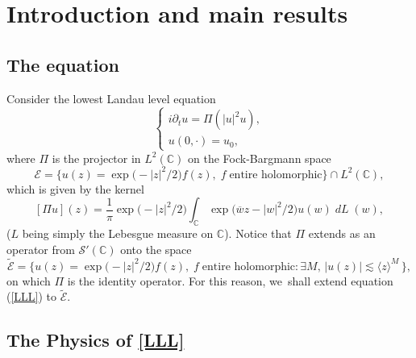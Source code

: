 \documentclass[JEP,XML,SOM,Unicode,NoFloatCountersInSection,published]{cedram}
\let\sep:
\DeclareMathOperator{\dL}{\mathit{dL}}
\theoremstyle{definition}
\let\EE\exp
\let\ov\overline
\let\<\langle
\let\>\rangle
\newcommand\C{\mathbb C}
\begin{document}
\maketitle

\tableofcontents
\mainmatter

\section{Introduction and main results}

\subsection{The equation}

Consider the lowest Landau level equation\vspace*{-3pt}
\begin{equation}\label{LLL}\tag{LLL}
\begin{cases}
i \partial_t u = \Pi (|u|^2 u),\\
u(0,\cdot)= u_0,
\end{cases}
\end{equation}
where $\Pi$ is the projector in $L^2(\C)$ on the Fock-Bargmann space\vspace*{-3pt}
\[
\mathcal{E} =\bigl\{ u(z) = \EE\bigl(-{|z|^2}/2\bigr) f(z),\;f \; \text{entire\ holomorphic}\bigr\}\cap L^2(\C),
\]
which is given by the kernel\vspace*{-3pt}
\begin{equation}\label{defPi}
[\Pi u](z) = \frac{1}{\pi} \EE\bigl(-{|z|^2}/2\bigr) \int_\mathbb{C} \EE\bigl(\ov w z - |w|^2/2\bigr) u(w) \dL(w),
\end{equation}
($L$ being simply the Lebesgue measure on $\C$). Notice that $\Pi $ extends as an operator from $\mathscr{S}'(\C)$ onto the space\vspace*{-3pt}
\[
\widetilde {\mathcal E}=\bigl\{ u(z) =\EE\bigl(-{|z|^2}/2\bigr) f(z),\;f \; \text{entire\ holomorphic}\sep\exists M,\, \vert u(z)\vert \lesssim \< z\>^M \, \bigr\},
\]
on which $\Pi $ is the identity operator. For this reason, we~shall extend equation (\ref{LLL}) to $\widetilde {\mathcal E}$.

\subsection{The Physics of \eqref{LLL}}
\end{document}
